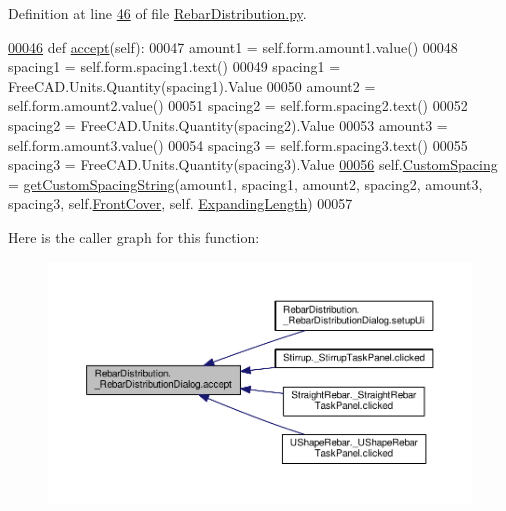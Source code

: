 Definition at line \hyperlink{RebarDistribution_8py_source_l00046}{46} of file \hyperlink{RebarDistribution_8py_source}{Rebar\+Distribution.\+py}.


\begin{DoxyCode}
\hypertarget{classRebarDistribution_1_1__RebarDistributionDialog.tex_l00046}{}\hyperlink{classRebarDistribution_1_1__RebarDistributionDialog_a518692f4a12113a2bcdfeaa0676f87be}{00046}     \textcolor{keyword}{def }\hyperlink{classRebarDistribution_1_1__RebarDistributionDialog_a518692f4a12113a2bcdfeaa0676f87be}{accept}(self):
00047         amount1 = self.form.amount1.value()
00048         spacing1 = self.form.spacing1.text()
00049         spacing1 = FreeCAD.Units.Quantity(spacing1).Value
00050         amount2 = self.form.amount2.value()
00051         spacing2 = self.form.spacing2.text()
00052         spacing2 = FreeCAD.Units.Quantity(spacing2).Value
00053         amount3 = self.form.amount3.value()
00054         spacing3 = self.form.spacing3.text()
00055         spacing3 = FreeCAD.Units.Quantity(spacing3).Value
\hypertarget{classRebarDistribution_1_1__RebarDistributionDialog.tex_l00056}{}\hyperlink{classRebarDistribution_1_1__RebarDistributionDialog_a97a0dcc8195e3f9e489565af80c0674c}{00056}         self.\hyperlink{classRebarDistribution_1_1__RebarDistributionDialog_a97a0dcc8195e3f9e489565af80c0674c}{CustomSpacing} = \hyperlink{namespaceRebarDistribution_a22a12f260218752c4099cf68e4e3da5c}{getCustomSpacingString}(amount1, spacing1, 
      amount2, spacing2, amount3, spacing3, self.\hyperlink{classRebarDistribution_1_1__RebarDistributionDialog_aeda0fd1b138f0b5f3b79d5c6e622b650}{FrontCover}, self.
      \hyperlink{classRebarDistribution_1_1__RebarDistributionDialog_a4d1d9185846a10dff90c07a397077ae2}{ExpandingLength})
00057 
\end{DoxyCode}


Here is the caller graph for this function\+:\nopagebreak
\begin{figure}[H]
\begin{center}
\leavevmode
\includegraphics[width=350pt]{classRebarDistribution_1_1__RebarDistributionDialog_a518692f4a12113a2bcdfeaa0676f87be_icgraph}
\end{center}
\end{figure}


